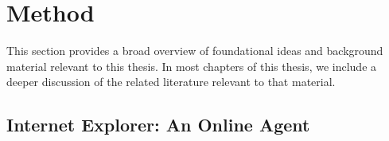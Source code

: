 \chapter{Method}
This section provides a broad overview of foundational ideas
and background material relevant to this thesis.
In most chapters of this thesis, we include a deeper
discussion of the related literature relevant to
that material.


\section{Internet Explorer: An Online Agent}

